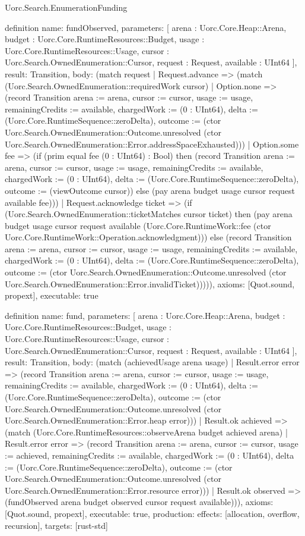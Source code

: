 \begin{lexlean}{Uorc.Search.EnumerationFunding}
\begin{semanticmodule}
definition{
  name: fundObserved,
  parameters: [
    arena : Uorc.Core.Heap::Arena,
    budget : Uorc.Core.RuntimeResources::Budget,
    usage : Uorc.Core.RuntimeResources::Usage,
    cursor : Uorc.Search.OwnedEnumeration::Cursor,
    request : Request,
    available : UInt64
  ],
  result: Transition,
  body: (match request
    | Request.advance => (match (Uorc.Search.OwnedEnumeration::requiredWork cursor)
      | Option.none => (record Transition {arena := arena, cursor := cursor, usage := usage, remainingCredits := available, chargedWork := (0 : UInt64), delta := (Uorc.Core.RuntimeSequence::zeroDelta), outcome := (ctor Uorc.Search.OwnedEnumeration::Outcome.unresolved (ctor Uorc.Search.OwnedEnumeration::Error.addressSpaceExhausted))})
      | Option.some fee => (if (prim equal fee (0 : UInt64) : Bool) then (record Transition {arena := arena, cursor := cursor, usage := usage, remainingCredits := available, chargedWork := (0 : UInt64), delta := (Uorc.Core.RuntimeSequence::zeroDelta), outcome := (viewOutcome cursor)}) else (pay arena budget usage cursor request available fee)))
    | Request.acknowledge ticket => (if (Uorc.Search.OwnedEnumeration::ticketMatches cursor ticket) then (pay arena budget usage cursor request available (Uorc.Core.RuntimeWork::fee (ctor Uorc.Core.RuntimeWork::Operation.acknowledgment))) else (record Transition {arena := arena, cursor := cursor, usage := usage, remainingCredits := available, chargedWork := (0 : UInt64), delta := (Uorc.Core.RuntimeSequence::zeroDelta), outcome := (ctor Uorc.Search.OwnedEnumeration::Outcome.unresolved (ctor Uorc.Search.OwnedEnumeration::Error.invalidTicket))}))),
  axioms: [Quot.sound, propext],
  executable: true
}

definition{
  name: fund,
  parameters: [
    arena : Uorc.Core.Heap::Arena,
    budget : Uorc.Core.RuntimeResources::Budget,
    usage : Uorc.Core.RuntimeResources::Usage,
    cursor : Uorc.Search.OwnedEnumeration::Cursor,
    request : Request,
    available : UInt64
  ],
  result: Transition,
  body: (match (achievedUsage arena usage)
    | Result.error error => (record Transition {arena := arena, cursor := cursor, usage := usage, remainingCredits := available, chargedWork := (0 : UInt64), delta := (Uorc.Core.RuntimeSequence::zeroDelta), outcome := (ctor Uorc.Search.OwnedEnumeration::Outcome.unresolved (ctor Uorc.Search.OwnedEnumeration::Error.heap error))})
    | Result.ok achieved => (match (Uorc.Core.RuntimeResources::observeArena budget achieved arena)
      | Result.error error => (record Transition {arena := arena, cursor := cursor, usage := achieved, remainingCredits := available, chargedWork := (0 : UInt64), delta := (Uorc.Core.RuntimeSequence::zeroDelta), outcome := (ctor Uorc.Search.OwnedEnumeration::Outcome.unresolved (ctor Uorc.Search.OwnedEnumeration::Error.resource error))})
      | Result.ok observed => (fundObserved arena budget observed cursor request available))),
  axioms: [Quot.sound, propext],
  executable: true,
  production: {effects: [allocation, overflow, recursion], targets: [rust-std]}
}


\end{semanticmodule}
\end{lexlean}
